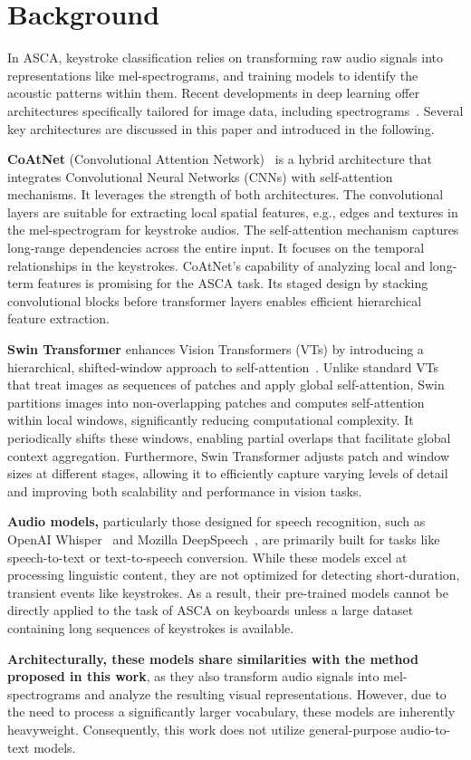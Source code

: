 
\section{Background}
\label{sec:background}

In ASCA, keystroke classification relies on transforming raw audio signals into representations like mel-spectrograms, and training models to identify the acoustic patterns within them. Recent developments in deep learning offer architectures specifically tailored for image data, including spectrograms~\cite{yang2023slnet, esmaeilpour2020sound, taheritajar2024survey}. Several key architectures are discussed in this paper and introduced in the following.

\textbf{CoAtNet} (Convolutional Attention Network)~\cite{dai2021coatnet} is a hybrid architecture that integrates Convolutional Neural Networks (CNNs) with self-attention mechanisms. It leverages the strength of both architectures. The convolutional layers are suitable for extracting local spatial features, e.g., edges and textures in the mel-spectrogram for keystroke audios. The self-attention mechanism captures long-range dependencies across the entire input. It focuses on the temporal relationships in the keystrokes. CoAtNet's capability of analyzing local and long-term features is promising for the ASCA task. Its staged design by stacking convolutional blocks before transformer layers enables efficient hierarchical feature extraction.

\textbf{Swin Transformer} enhances Vision Transformers (VTs) by introducing a hierarchical, shifted-window approach to self-attention~\cite{liu2021swin}. Unlike standard VTs that treat images as sequences of patches and apply global self-attention, Swin partitions images into non-overlapping patches and computes self-attention within local windows, significantly reducing computational complexity. It periodically shifts these windows, enabling partial overlaps that facilitate global context aggregation. Furthermore, Swin Transformer adjusts patch and window sizes at different stages, allowing it to efficiently capture varying levels of detail and improving both scalability and performance in vision tasks.

\textbf{Audio models,} particularly those designed for speech recognition, such as OpenAI Whisper~\cite{radford2023robust} and Mozilla DeepSpeech~\cite{hannun2014deep}, are primarily built for tasks like speech-to-text or text-to-speech conversion. While these models excel at processing linguistic content, they are not optimized for detecting short-duration, transient events like keystrokes. As a result, their pre-trained models cannot be directly applied to the task of ASCA on keyboards unless a large dataset containing long sequences of keystrokes is available.

\textbf{Architecturally, these models share similarities with the method proposed in this work}, as they also transform audio signals into mel-spectrograms and analyze the resulting visual representations. However, due to the need to process a significantly larger vocabulary, these models are inherently heavyweight. Consequently, this work does not utilize general-purpose audio-to-text models.